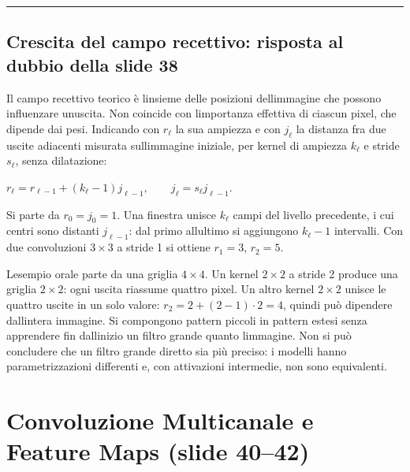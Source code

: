 \documentclass[11pt,a4paper,oneside,openany]{book}
\begin{document}
\begin{center}\rule{0.5\linewidth}{0.5pt}\end{center}

\subsection{Crescita del campo recettivo: risposta al dubbio della slide 38}\label{f02-r473}

Il campo recettivo teorico è l\textquotesingle insieme delle posizioni dell\textquotesingle immagine che possono influenzare un\textquotesingle uscita. Non coincide con l\textquotesingle importanza effettiva di ciascun pixel, che dipende dai pesi. Indicando con \(r_\ell\) la sua ampiezza e con \(j_\ell\) la distanza fra due uscite adiacenti misurata sull\textquotesingle immagine iniziale, per kernel di ampiezza \(k_\ell\) e stride \(s_\ell\), senza dilatazione: \begin{center}
\begin{adjustbox}{max width=\linewidth}
$\displaystyle 
\boxed{r_\ell=r_{\ell-1}+(k_\ell-1)j_{\ell-1},\qquad j_\ell=s_\ell j_{\ell-1}.}
$
\end{adjustbox}
\end{center} Si parte da \(r_0=j_0=1\). Una finestra unisce \(k_\ell\) campi del livello precedente, i cui centri sono distanti \(j_{\ell-1}\): dal primo all\textquotesingle ultimo si aggiungono \(k_\ell-1\) intervalli. Con due convoluzioni \(3\times3\) a stride 1 si ottiene \(r_1=3\), \(r_2=5\).

L\textquotesingle esempio orale parte da una griglia \(4\times4\). Un kernel \(2\times2\) a stride 2 produce una griglia \(2\times2\): ogni uscita riassume quattro pixel. Un altro kernel \(2\times2\) unisce le quattro uscite in un solo valore: \(r_2=2+(2-1)\cdot2=4\), quindi può dipendere dall\textquotesingle intera immagine. Si compongono pattern piccoli in pattern estesi senza apprendere fin dall\textquotesingle inizio un filtro grande quanto l\textquotesingle immagine. Non si può concludere che un filtro grande diretto sia più preciso: i modelli hanno parametrizzazioni differenti e, con attivazioni intermedie, non sono equivalenti.

\section{Convoluzione Multicanale e Feature Maps (slide 40--42)}\label{f02-r483}
\end{document}
